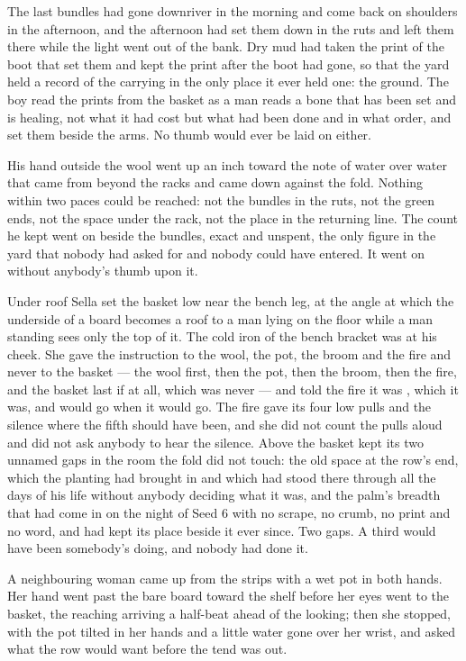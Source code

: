 The last bundles had gone downriver in the morning and come back on shoulders in the afternoon, and the afternoon had set them down in the ruts and left them there while the light went out of the bank. Dry mud had taken the print of the boot that set them and kept the print after the boot had gone, so that the yard held a record of the carrying in the only place it ever held one: the ground. The boy read the prints from the basket as a man reads a bone that has been set and is healing, not what it had cost but what had been done and in what order, and set them beside the arms. No thumb would ever be laid on either.

His hand outside the wool went up an inch toward the note of water over water that came from beyond the racks and came down against the fold. Nothing within two paces could be reached: not the bundles in the ruts, not the green ends, not the space under the rack, not the place in the returning line. The count he kept went on beside the bundles, exact and unspent, the only figure in the yard that nobody had asked for and nobody could have entered. It went on without anybody's thumb upon it.

\scenebreak

Under  roof Sella set the basket low near the bench leg, at the angle at which the underside of a board becomes a roof to a man lying on the floor while a man standing sees only the top of it. The cold iron of the bench bracket was at his cheek. She gave the instruction to the wool, the pot, the broom and the fire and never to the basket --- the wool first, then the pot, then the broom, then the fire, and the basket last if at all, which was never --- and told the fire it was , which it was, and would go when it would go. The fire gave its four low pulls and the silence where the fifth should have been, and she did not count the pulls aloud and did not ask anybody to hear the silence. Above the basket  kept its two unnamed gaps in the room the fold did not touch: the old space at the row's end, which the planting had brought in and which had stood there through all the days of his life without anybody deciding what it was, and the palm's breadth that had come in on the night of Seed 6 with no scrape, no crumb, no print and no word, and had kept its place beside it ever since. Two gaps. A third would have been somebody's doing, and nobody had done it.

A neighbouring woman came up from the strips with a wet pot in both hands. Her hand went past the bare board toward the shelf before her eyes went to the basket, the reaching arriving a half-beat ahead of the looking; then she stopped, with the pot tilted in her hands and a little water gone over her wrist, and asked what the row would want before the tend was out.

